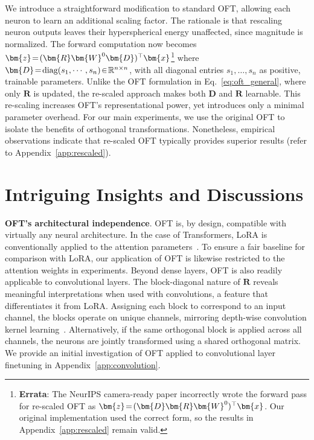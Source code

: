 We introduce a straightforward modification to standard OFT, allowing each neuron to learn an additional scaling factor. The rationale is that rescaling neuron outputs leaves their hyperspherical energy unaffected, since magnitude is normalized. The forward computation now becomes $\thickmuskip=2mu \medmuskip=2mu\bm{z}=(\bm{R}\bm{W}^0\bm{D})^\top\bm{x}$\footnote{\textbf{Errata}: The NeurIPS camera-ready paper incorrectly wrote the forward pass for re-scaled OFT as $\thickmuskip=2mu \medmuskip=2mu\bm{z}=(\bm{D}\bm{R}\bm{W}^0)^\top\bm{x}$. Our original implementation used the correct form, so the results in Appendix~\ref{app:rescaled} remain valid.} where $\thickmuskip=2mu \medmuskip=2mu \bm{D}=\text{diag}(s_1,\cdots,s_n)\in\mathbb{R}^{n\times n}$, with all diagonal entries $s_1,\ldots,s_n$ as positive, trainable parameters. Unlike the OFT formulation in Eq.~\eqref{eq:oft_general}, where only $\bm{R}$ is updated, the re-scaled approach makes both $\bm{D}$ and $\bm{R}$ learnable. This re-scaling increases OFT's representational power, yet introduces only a minimal parameter overhead. For our main experiments, we use the original OFT to isolate the benefits of orthogonal transformations. Nonetheless, empirical observations indicate that re-scaled OFT typically provides superior results (refer to Appendix~\ref{app:rescaled}).

\section{Intriguing Insights and Discussions}

\textbf{OFT's architectural independence}. OFT is, by design, compatible with virtually any neural architecture. In the case of Transformers, LoRA is conventionally applied to the attention parameters~\cite{hulora2022}. To ensure a fair baseline for comparison with LoRA, our application of OFT is likewise restricted to the attention weights in experiments. Beyond dense layers, OFT is also readily applicable to convolutional layers. The block-diagonal nature of $\bm{R}$ reveals meaningful interpretations when used with convolutions, a feature that differentiates it from LoRA. Assigning each block to correspond to an input channel, the blocks operate on unique channels, mirroring depth-wise convolution kernel learning~\cite{chollet2017xception}. Alternatively, if the same orthogonal block is applied across all channels, the neurons are jointly transformed using a shared orthogonal matrix. We provide an initial investigation of OFT applied to convolutional layer finetuning in Appendix~\ref{app:convolution}.


